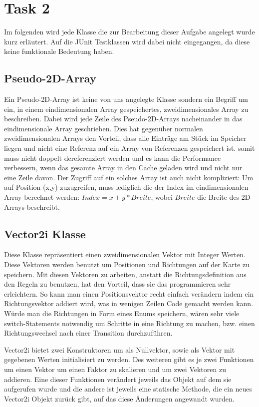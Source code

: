 \section{Task 2}
Im folgenden wird jede Klasse die zur Bearbeitung dieser Aufgabe angelegt wurde kurz erläutert. Auf die JUnit Testklassen wird dabei nicht eingegangen, da diese keine funktionale Bedeutung haben.
\subsection{Pseudo-2D-Array}
\label{subsec:PseudoArr}
Ein Pseudo-2D-Array ist keine von uns angelegte Klasse sondern ein Begriff um ein, in einem eindimensionalen Array gespeichertes, zweidimensionales Array zu beschreiben. Dabei wird jede Zeile des Pseudo-2D-Arrays nacheinander in das eindimensionale Array geschrieben. Dies hat gegenüber normalen zweidimensionalen Arrays den Vorteil, dass alle Einträge am Stück im Speicher liegen und nicht eine Referenz auf ein Array von Referenzen gespeichert ist. somit muss nicht doppelt dereferenziert werden und es kann die Performance verbessern, wenn das gesamte Array in den Cache geladen wird und nicht nur eine Zeile davon. Der Zugriff auf ein solches Array ist auch nicht kompliziert: Um auf Position (x,y) zuzugreifen, muss lediglich die der Index im eindimensionalen Array berechnet werden: $Index=x+y*Breite$, wobei $Breite$ die Breite des 2D-Arrays beschreibt. 
\subsection{Vector2i Klasse}
\label{subsec:Vector2i}
Diese Klasse repräsentiert einen zweidimensionalen Vektor mit Integer Werten.
Diese Vektoren werden benutzt um Positionen und Richtungen auf der Karte zu speichern.
Mit diesen Vektoren zu arbeiten, anstatt die Richtungsdefinition aus den Regeln zu benutzen, hat den Vorteil, dass sie das programmieren sehr erleichtern. So kann man einen Positionsvektor recht einfach verändern indem ein Richtungsvektor addiert wird, was in wenigen Zeilen Code gemacht werden kann. Würde man die Richtungen in Form eines Enums speichern, wären sehr viele switch-Statements notwendig um Schritte in eine Richtung zu machen, bzw. einen Richtungswechsel nach einer Transition durchzuführen.

Vector2i bietet zwei Konstruktoren um als Nullvektor, sowie als Vektor mit gegebenen Werten initialisiert zu werden.
Des weiteren gibt es je zwei Funktionen um einen Vektor um einen Faktor zu skalieren und um zwei Vektoren zu addieren. Eine dieser Funktionen verändert jeweils das Objekt auf dem sie aufgerufen wurde und die andere ist jeweils eine statische Methode, die ein neues Vector2i Objekt zurück gibt, auf das diese Änderungen angewandt wurden.
